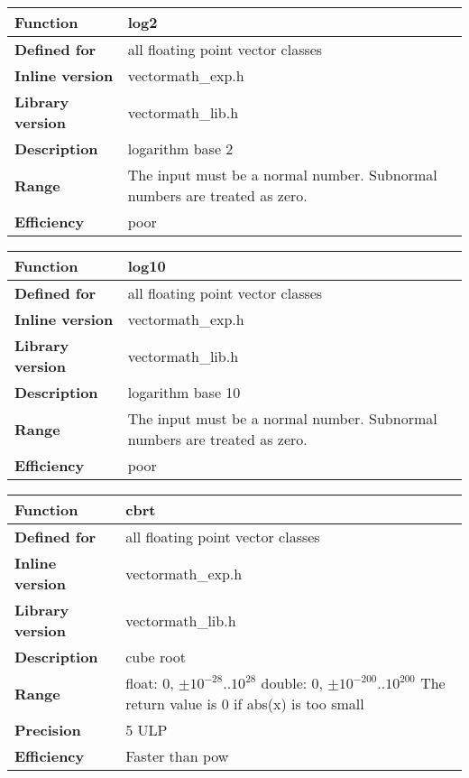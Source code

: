 \documentclass[vcl_manual.tex]{subfiles}
\begin{document}
\begin{tabular}{|p{30mm}|p{120mm}|}
\hline
\bfseries Function & log2 \\ \hline
\bfseries Defined for & all floating point vector classes \\ \hline
\bfseries Inline version & vectormath\_exp.h \\ \hline
\bfseries Library version & vectormath\_lib.h \\ \hline
\bfseries Description & logarithm base 2  \\ \hline
\bfseries Range & The input must be a normal number. Subnormal numbers are treated as zero. \\ \hline
\bfseries Efficiency & poor \\ \hline
\end{tabular}


\begin{tabular}{|p{30mm}|p{120mm}|}
\hline
\bfseries Function & log10 \\ \hline
\bfseries Defined for & all floating point vector classes \\ \hline
\bfseries Inline version & vectormath\_exp.h \\ \hline
\bfseries Library version & vectormath\_lib.h \\ \hline
\bfseries Description & logarithm base 10  \\ \hline
\bfseries Range & The input must be a normal number. Subnormal numbers are treated as zero. \\ \hline
\bfseries Efficiency & poor \\ \hline
\end{tabular}

\label{cbrt}
\begin{tabular}{|p{30mm}|p{120mm}|}
\hline
\bfseries Function & cbrt \\ \hline
\bfseries Defined for & all floating point vector classes \\ \hline
\bfseries Inline version & vectormath\_exp.h \\ \hline
\bfseries Library version & vectormath\_lib.h \\ \hline
\bfseries Description & cube root  \\ \hline
\bfseries Range & float: 0, $\pm 10^{-28} ..{}  10^{28}$ \newline
                  double: 0, $\pm 10^{-200} ..{}  10^{200}$ \newline
                  The return value is 0 if abs(x) is too small \\ \hline
\bfseries Precision & 5 ULP \\ \hline                  
\bfseries Efficiency & Faster than pow \\ \hline
\end{tabular}
\end{document}
